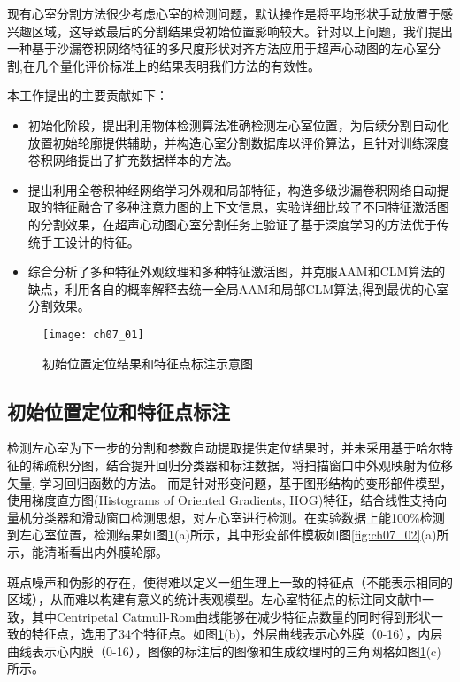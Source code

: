 现有心室分割方法很少考虑心室的检测问题\citep{jixianghu-2016}，默认操作是将平均形状手动放置于感兴趣区域，这导致最后的分割结果受初始位置影响较大。针对以上问题，我们提出一种基于沙漏卷积网络特征的多尺度形状对齐方法应用于超声心动图的左心室分割,在几个量化评价标准上的结果表明我们方法的有效性。

本工作提出的主要贡献如下：
\begin{itemize}
    \item 初始化阶段，提出利用物体检测算法准确检测左心室位置，为后续分割自动化放置初始轮廓提供辅助，并构造心室分割数据库以评价算法，且针对训练深度卷积网络提出了扩充数据样本的方法。

    \item 提出利用全卷积神经网络学习外观和局部特征，构造多级沙漏卷积网络自动提取的特征融合了多种注意力图的上下文信息，实验详细比较了不同特征激活图的分割效果，在超声心动图心室分割任务上验证了基于深度学习的方法优于传统手工设计的特征。

    \item 综合分析了多种特征外观纹理和多种特征激活图，并克服AAM和CLM算法的缺点，利用各自的概率解释去统一全局AAM和局部CLM算法,得到最优的心室分割效果。
\end{itemize}
\begin{figure}[!htbp]
\centering
\texttt{[image: ch07\_01]}
\caption{初始位置定位结果和特征点标注示意图}
\label{fig:ch07_01}
\end{figure}
\subsection{初始位置定位和特征点标注}

检测左心室为下一步的分割和参数自动提取提供定位结果时，并未采用基于哈尔特征的稀疏积分图，结合提升回归分类器\citep{Zhou2007}和标注数据，将扫描窗口中外观映射为位移矢量, 学习回归函数的方法。
而是针对形变问题，基于图形结构的变形部件模型，使用梯度直方图(Histograms of Oriented Gradients, HOG)特征\citep{Dalal2005}，结合线性支持向量机分类器和滑动窗口检测思想，对左心室进行检测。在实验数据上能100\%检测到左心室位置，检测结果如图\ref{fig:ch07_01}(a)所示，其中形变部件模板如图\ref{fig:ch07_02}(a)所示，能清晰看出内外膜轮廓。

斑点噪声和伪影的存在，使得难以定义一组生理上一致的特征点（不能表示相同的区域），从而难以构建有意义的统计表观模型。左心室特征点的标注同文献中一致，其中Centripetal Catmull-Rom曲线能够在减少特征点数量的同时得到形状一致的特征点，选用了34个特征点。如图\ref{fig:ch07_01}(b)，外层曲线表示心外膜（0-16），内层曲线表示心内膜（0-16），图像的标注后的图像和生成纹理时的三角网格如图\ref{fig:ch07_01}(c)所示。

